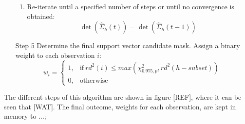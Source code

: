 \documentclass[preprint,12pt]{elsarticle}
\begin{document}
\begin{itemize}
\begin{enumerate}
		\item Re-iterate until a specified number of steps or until no convergence is obtained:
		\begin{equation}
		\det(\hat{\Sigma}_h(t))=\det(\hat{\Sigma}_h(t-1))
		\end{equation}
	\end{enumerate}
	\item [Step 5] Determine the final support vector candidate mask. Assign a binary weight to each observation $i$:
	\begin{equation}
	w_i =
	\begin{cases}
	1, & \text{if}\ rd^2(i) \leq max(\chi^2_{0.975, p}, rd^2(h-subset)) \\
	0, & \text{otherwise}
	\end{cases}
	\end{equation}
\end{itemize}
The different steps of this algorithm are shown in figure [REF], where it can be seen that [WAT]. The final outcome, weights for each observation, are kept in memory to ...;
\end{document}
